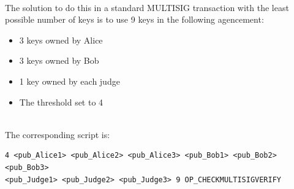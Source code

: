 \documentclass[11pt]{article}
\begin{document}
\begin{enumerate}
\begin{enumerate}
\begin{itemize}
        \end{itemize}
        \\ The solution to do this in a standard MULTISIG transaction with the least possible number of keys is to use 9 keys in the following agencement:
        \begin{itemize}
            \item 3 keys owned by Alice
            \item 3 keys owned by Bob
            \item 1 key owned by each judge
            \item The threshold set to 4
        \end{itemize}
        \\ The corresponding script is:
        \begin{verbatim}
4 <pub_Alice1> <pub_Alice2> <pub_Alice3> <pub_Bob1> <pub_Bob2> <pub_Bob3> 
<pub_Judge1> <pub_Judge2> <pub_Judge3> 9 OP_CHECKMULTISIGVERIFY
        \end{verbatim}
    

\end{enumerate}
\end{enumerate}
\end{document}
